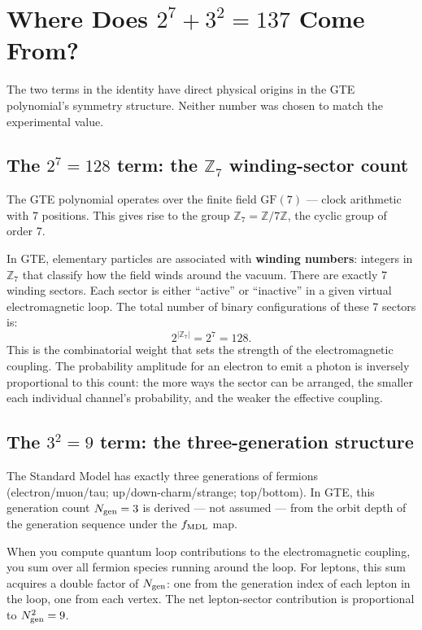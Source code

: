 \documentclass[11pt,a4paper]{article}
\newcommand{\term}[1]{\textbf{#1}}
\newcommand{\ZS}{\mathbb{Z}_7}
\newcommand{\Ngen}{N_{\rm gen}}
\begin{document}
\section{Where Does $2^7 + 3^2 = 137$ Come From?}

The two terms in the identity have direct physical origins in the GTE polynomial's
symmetry structure.  Neither number was chosen to match the experimental value.

\subsection{The $2^7 = 128$ term: the \texorpdfstring{$\mathbb{Z}_7$}{Z7} winding-sector count}

The GTE polynomial operates over the finite field $\mathrm{GF}(7)$ --- clock
arithmetic with 7 positions.  This gives rise to the group $\ZS = \mathbb{Z}/7\mathbb{Z}$,
the cyclic group of order 7.

In GTE, elementary particles are associated with \term{winding numbers}: integers
in $\mathbb{Z}_7$ that classify how the field winds around the vacuum.  There are
exactly 7 winding sectors.  Each sector is either ``active'' or ``inactive'' in a
given virtual electromagnetic loop.  The total number of binary configurations of
these 7 sectors is:
\[
  2^{|\ZS|} = 2^7 = 128.
\]
This is the combinatorial weight that sets the strength of the electromagnetic
coupling.  The probability amplitude for an electron to emit a photon is
inversely proportional to this count: the more ways the sector can be arranged,
the smaller each individual channel's probability, and the weaker the effective
coupling.

\subsection{The $3^2 = 9$ term: the three-generation structure}

The Standard Model has exactly three generations of fermions (electron/muon/tau;
up/down-charm/strange; top/bottom).  In GTE, this generation count $\Ngen = 3$
is derived — not assumed — from the orbit depth of the generation sequence under
the $f_{\rm MDL}$ map.

When you compute quantum loop contributions to the electromagnetic coupling,
you sum over all fermion species running around the loop.  For leptons, this
sum acquires a double factor of $\Ngen$: one from the generation index of
each lepton in the loop, one from each vertex.  The net lepton-sector
contribution is proportional to $\Ngen^2 = 9$.
\end{document}
